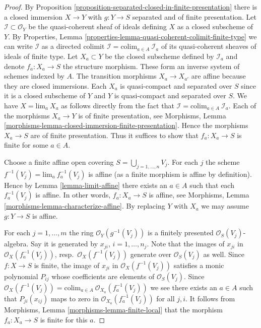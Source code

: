 \begin{proof}
By Proposition \ref{proposition-separated-closed-in-finite-presentation}
there is a closed immersion $X \to Y$ with $g : Y \to S$
separated and of finite presentation. Let $\mathcal{I} \subset \mathcal{O}_Y$
be the quasi-coherent sheaf of ideals defining $X$ as a closed
subscheme of $Y$. By
Properties, Lemma \ref{properties-lemma-quasi-coherent-colimit-finite-type}
we can write $\mathcal{I}$ as a directed colimit
$\mathcal{I} = \text{colim}_{a \in A}\ \mathcal{I}_a$ of its
quasi-coherent sheaves of ideals of finite type.
Let $X_a \subset Y$ be the closed subscheme defined by $\mathcal{I}_a$
and denote $f_a : X_a \to S$ the structure morphism.
These form an inverse system of schemes indexed by $A$.
The transition morphisms $X_a \to X_{a'}$ are affine because
they are closed immersions. Each $X_a$ is quasi-compact and separated
over $S$ since it is a closed subscheme of $Y$ and $Y$ is quasi-compact and
separated over $S$.
We have $X = \text{lim}_a\ X_a$ as follows directly from the
fact that $\mathcal{I} = \text{colim}_{a \in A}\ \mathcal{I}_a$.
Each of the morphisms $X_a \to Y$ is of finite presentation, see
Morphisms, Lemma \ref{morphisms-lemma-closed-immersion-finite-presentation}.
Hence the morphisms $X_a \to S$ are of finite presentation.
Thus it suffices to show that $f_a : X_a \to S$ is finite for some
$a \in A$.

\medskip\noindent
Choose a finite affine open covering $S = \bigcup_{j = 1, \ldots, n} V_j$.
For each $j$ the scheme $f^{-1}(V_j) = \text{lim}_a\ f_a^{-1}(V_j)$
is affine (as a finite morphism is affine by definition). Hence by
Lemma \ref{lemma-limit-affine} there exists an $a \in A$ such that
each $f_a^{-1}(V_j)$ is affine. In other words, $f_a : X_a \to S$ is
affine, see Morphisms, Lemma \ref{morphisms-lemma-characterize-affine}.
By replacing $Y$ with $X_a$ we may assume $g : Y \to S$ is affine.

\medskip\noindent
For each $j = 1, \ldots, m$ the ring $\mathcal{O}_Y(g^{-1}(V_j))$
is a finitely presented $\mathcal{O}_S(V_j)$-algebra. Say it is
generated by $x_{ji}$, $i = 1, \ldots, n_j$. Note that the images
of $x_{ji}$ in $\mathcal{O}_X(f_a^{-1}(V_j))$, resp.\ 
$\mathcal{O}_X(f^{-1}(V_j))$ generate over $\mathcal{O}_S(V_j)$ as well.
Since $f : X \to S$ is
finite, the image of $x_{ji}$ in $\mathcal{O}_X(f^{-1}(V_j))$
satisfies a monic polynomial $P_{ij}$ whose coefficients
are elements of $\mathcal{O}_S(V_j)$. Since
$\mathcal{O}_X(f^{-1}(V_j)) =
\text{colim}_{a \in A}\ \mathcal{O}_{X_a}(f_a^{-1}(V_j))$
we see there exists an $a \in A$ such that
$P_{ji}(x_{ij})$ maps to zero in $\mathcal{O}_{X_a}(f_a^{-1}(V_j))$
for all $j, i$. It follows from
Morphisms, Lemma \ref{morphisms-lemma-finite-local}
that the morphism $f_a : X_a \to S$ is finite for this $a$.
\end{proof}





















